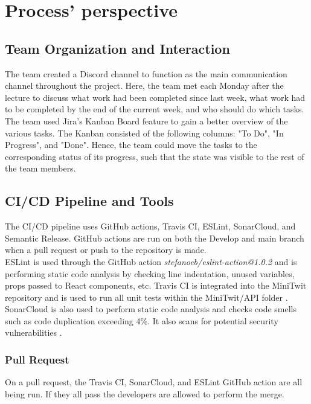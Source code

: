 \section{Process' perspective}

\subsection{Team Organization and Interaction}
The team created a Discord channel to function as the main communication channel throughout the project. Here, the team met each Monday after the lecture to discuss what work had been completed since last week, what work had to be completed by the end of the current week, and who should do which tasks. \\
The team used Jira's Kanban Board feature\cite{jira} to gain a better overview of the various tasks. The Kanban consisted of the following columns: "To Do", "In Progress", and "Done". Hence, the team could move the tasks to the corresponding status of its progress, such that the state was visible to the rest of the team members.

\subsection{CI/CD Pipeline and Tools} \label{CI/CD}
The CI/CD pipeline uses GitHub actions, Travis CI, ESLint, SonarCloud, and Semantic Release. GitHub actions are run on both the Develop and main branch when a pull request or push to the repository is made. \\

ESLint is used through the GitHub action \textit{stefanoeb/eslint-action@1.0.2} \cite{eslint-action} and is performing static code analysis by checking line indentation, unused variables, props passed to React components, etc. Travis CI is integrated into the MiniTwit repository and is used to run all unit tests within the MiniTwit/API folder \cite{travis-ci}. SonarCloud is also used to perform static code analysis and checks code smells such as code duplication exceeding 4\%. It also scans for potential security vulnerabilities \cite{sonarcloud}.

\subsubsection{Pull Request}
On a pull request, the Travis CI, SonarCloud, and ESLint GitHub action are all being run. If they all pass the developers are allowed to perform the merge.

